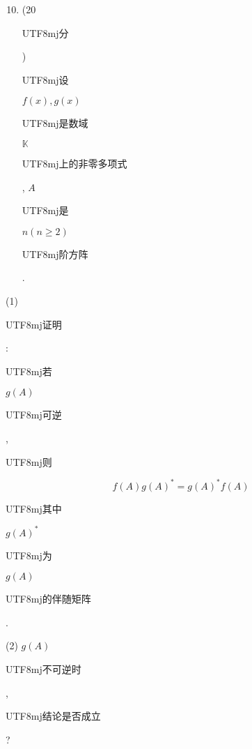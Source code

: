 \documentclass[10pt]{article}
\begin{document}
\begin{enumerate}
  \setcounter{enumi}{9}
  \item (20 \begin{CJK}{UTF8}{mj}分\end{CJK}) \begin{CJK}{UTF8}{mj}设\end{CJK} $f(x), g(x)$ \begin{CJK}{UTF8}{mj}是数域\end{CJK} $\mathbb{K}$ \begin{CJK}{UTF8}{mj}上的非零多项式\end{CJK}, $A$ \begin{CJK}{UTF8}{mj}是\end{CJK} $n(n \geqslant 2)$ \begin{CJK}{UTF8}{mj}阶方阵\end{CJK}.
\end{enumerate}
(1) \begin{CJK}{UTF8}{mj}证明\end{CJK}: \begin{CJK}{UTF8}{mj}若\end{CJK} $g(A)$ \begin{CJK}{UTF8}{mj}可逆\end{CJK}, \begin{CJK}{UTF8}{mj}则\end{CJK}
$$
f(A) g(A)^{*}=g(A)^{*} f(A)
$$
\begin{CJK}{UTF8}{mj}其中\end{CJK} $g(A)^{*}$ \begin{CJK}{UTF8}{mj}为\end{CJK} $g(A)$ \begin{CJK}{UTF8}{mj}的伴随矩阵\end{CJK}.

(2) $g(A)$ \begin{CJK}{UTF8}{mj}不可逆时\end{CJK}, \begin{CJK}{UTF8}{mj}结论是否成立\end{CJK}?
\end{document}

